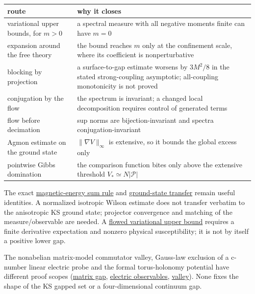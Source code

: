 \documentclass[11pt,a4paper]{article}
\begin{document}
\begin{longtable}[]{@{}
  >{\raggedright\arraybackslash}p{}
  >{\raggedright\arraybackslash}p{}@{}}
\toprule\noalign{}
\begin{minipage}[b]{\linewidth}\raggedright
route
\end{minipage} & \begin{minipage}[b]{\linewidth}\raggedright
why it closes
\end{minipage} \\
\midrule\noalign{}
\endhead
\bottomrule\noalign{}
\endlastfoot
variational upper bounds, for \(m>0\) & a spectral measure with all
negative moments finite can have \(m=0\) \\
expansion around the free theory & the bound reaches \(m\) only at the
confinement scale, where its coefficient is nonperturbative \\
blocking by projection & a surface-to-gap estimate worsens by \(3M^2/8\)
in the stated strong-coupling asymptotic; all-coupling monotonicity is
not proved \\
conjugation by the flow & the spectrum is invariant; a changed local
decomposition requires control of generated terms \\
flow before decimation & sup norms are bijection-invariant and spectra
conjugation-invariant \\
Agmon estimate on the ground state & \(\|\nabla V\|_\infty\) is
extensive, so it bounds the global excess only \\
pointwise Gibbs domination & the comparison function bites only above
the extensive threshold \(V_*\simeq N|\mathcal P|\) \\
\end{longtable}

The exact
\href{ground-state-measure-transfer.md\#common-setting-and-magnetic-identities}{magnetic-energy
sum rule} and \href{ground-state-measure-transfer.md}{ground-state
transfer} remain useful identities. A normalized isotropic Wilson
estimate does not transfer verbatim to the anisotropic KS ground state;
projector convergence and matching of the measure/observable are needed.
A \href{finiteness-half-flowed-susceptibility.md}{flowed variational
upper bound} requires a finite derivative expectation and nonzero
physical susceptibility; it is not by itself a positive lower gap.

The nonabelian matrix-model commutator valley, Gauss-law exclusion of a
c-number linear electric probe and the formal torus-holonomy potential
have different proof scopes (\href{low-dimensional-mass-gap.md}{matrix
gap}, \href{lattice-gap-upper-bounds.md}{electric observables},
\href{torus-valley-potential.md}{valley}). None fixes the shape of the
KS gapped set or a four-dimensional continuum gap.
\end{document}
